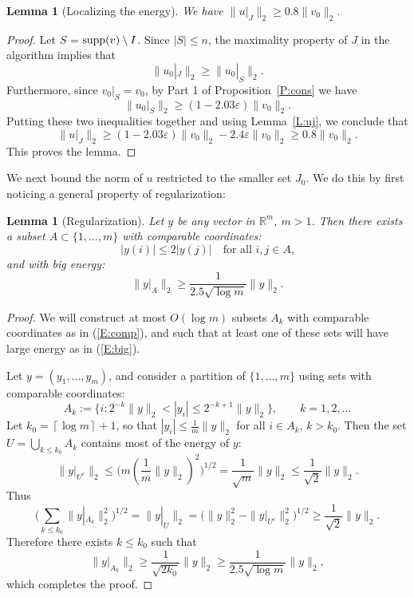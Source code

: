 \documentclass[12pt]{amsart}
\theoremstyle{plain}
\newtheorem{lemma}[theorem]{Lemma}
\theoremstyle{definition}
\theoremstyle{remark}
\numberwithin{equation}{section}
\begin{document}
\begin{lemma}[Localizing the energy]\label{C:uj}
  We have $\|u|_J\|_2 \ge 0.8 \|v_0\|_2$.
\end{lemma}

\begin{proof}
Let $S$ = ${{\rm supp}}(v) \setminus I$.
Since $|S| \leq n$, the maximality property of $J$ in the algorithm
implies that 
$$
\|u_0|_J\|_2 \geq \|u_0|_S\|_2.
$$
Furthermore, since $v_0|_S = v_0$, by Part 1 of Proposition~\ref{P:cons} we have
$$
\|u_0|_S\|_2 \geq (1 - 2.03{\varepsilon})\|v_0\|_2.
$$
Putting these two inequalities together and using
Lemma~\ref{L:uj}, we conclude that
$$
\|u|_J\|_2 \ge (1 - 2.03{\varepsilon})\|v_0\|_2 - 2.4{\varepsilon}\|v_0\|_2 \ge 0.8 \|v_0\|_2.
$$
This proves the lemma.
\end{proof}

We next bound the norm of $u$ restricted to the smaller set $J_0$. 
We do this by first noticing a general property of regularization:

\begin{lemma}[Regularization]\label{L:reg}
  Let $y$ be any vector in ${\mathbb{R}}^m$, $m > 1$.
  Then there exists a subset $A \subset \{1, \ldots, m\}$ 
  with comparable coordinates:
  \begin{equation}\label{E:comp}
    |y(i)| \le 2|y(j)| \quad \text{for all $i, j \in A$,}
  \end{equation}
  and with big energy:
  \begin{equation}\label{E:big} 
    \|y|_A\|_2 \ge \frac{1}{2.5\sqrt{\log m}}\|y\|_2.
  \end{equation}
\end{lemma}

\begin{proof}
We will construct at most $O(\log m)$ subsets $A_k$ with comparable coordinates 
as in (\ref{E:comp}), and such that at least one of these sets will have 
large energy as in (\ref{E:big}). 

Let $y = (y_1, \ldots, y_m)$, and consider a partition of $\{1, \ldots, m\}$ 
using sets with comparable coordinates:
$$
A_k := \{i : 2^{-k}\|y\|_2 < |y_i| \leq 2^{-k+1}\|y\|_2 \}, \qquad k=1, 2, \ldots 
$$
Let $k_0 = \left\lceil \log m \right\rceil + 1$, so that 
$|y_i| \leq \frac{1}{m}\|y\|_2$ for all $i \in A_k$, $k > k_0$.
Then the set $U = \bigcup_{k \le k_0} A_k$ contains most of the energy of $y$:
$$
\|y|_{U^c}\|_2 \le \big(m(\frac{1}{m}\|y\|_2)^2\big)^{1/2} = \frac{1}{\sqrt{m}}\|y\|_2
\le \frac{1}{\sqrt{2}}\|y\|_2.
$$
Thus
$$
\big( \sum_{k\leq k_0}\|y|_{A_k}\|_2^2 \big)^{1/2} 
= \|y|_U\|_2 = \big(\|y\|_2^2 - \|y|_{U^c}\|_2^2\big)^{1/2}
\ge \frac{1}{\sqrt{2}} \|y\|_2.
$$
Therefore there exists $k \leq k_0$ such that
$$
\|y|_{A_k}\|_2 \ge \frac{1}{\sqrt{2k_0}} \|y\|_2 
\ge \frac{1}{2.5\sqrt{\log m}}\|y\|_2,
$$
which completes the proof.
\end{proof}
\end{document}
